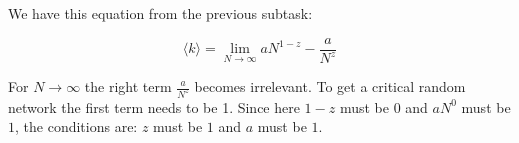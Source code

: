 \begin{enumerate}
	We have this equation from the previous subtask: 
	
	\begin{equation}
		\langle k \rangle = \lim\limits_{N \rightarrow \infty} aN^{1-z} - \frac{a}{N^z}
	\end{equation}
	
	For $N \rightarrow \infty$ the right term $\frac{a}{N^z}$ becomes irrelevant. To get a critical random network the first term needs to be 1.
	Since here $1-z$ must be $0$ and $aN^0$ must be $1$, the conditions are:  $z$ must be $1$ and $a$ must be $1$.
	
\end{enumerate}
